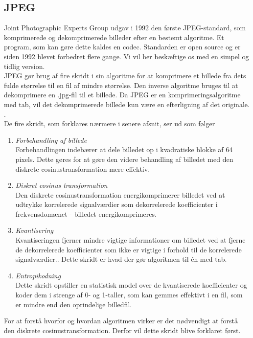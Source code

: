 \subsection{JPEG}
Joint Photographic Experts Group udgav i 1992 den første JPEG-standard, som komprimerede og dekomprimerede billeder efter en bestemt algoritme. Et program, som kan gøre dette kaldes en codec. Standarden er open source og er siden 1992 blevet forbedret flere gange. Vi vil her beskæftige os med en simpel og tidlig version.\\
JPEG gør brug af fire skridt i sin algoritme for at komprimere et billede fra dets fulde størrelse til en fil af mindre størrelse. Den inverse algoritme bruges til at dekomprimere en .jpg-fil til et billede. Da JPEG er en komprimeringsalgoritme med tab, vil det dekomprimerede billede kun være en efterligning af det originale. \citep{whydomath_basic}.\\
De fire skridt, som forklares nærmere i senere afsnit, ser ud som følger
\begin{enumerate}
	\item{\textit{Forbehandling af billede}\\
	Forbehandlingen indebærer at dele billedet op i kvadratiske blokke af 64 pixels. Dette gøres for at gøre den videre behandling af billedet med den diskrete cosinustransformation mere effektiv.}
	\item{\textit{Diskret cosinus transformation}\\
	Den diskrete cosinustransformation energikomprimerer billedet ved at udtrykke korrelerede signalværdier som dekorrelerede koefficienter i frekvensdomænet - billedet energikomprimeres.}
	\item{\textit{Kvantisering}\\
	Kvantiseringen fjerner mindre vigtige informationer om billedet ved at fjerne de dekorrelerede koefficienter som ikke er vigtige i forhold til de korrelerede signalværdier.. Dette skridt er hvad der gør algoritmen til én med tab.}
	\item{\textit{Entropikodning}\\
	Dette skridt opstiller en statistisk model over de kvantiserede koefficienter og koder dem i strenge af 0- og 1-taller, som kan gemmes effektivt i en fil, som er mindre end den oprindelige billedfil.}
\end{enumerate}

For at forstå hvorfor og hvordan algoritmen virker er det nødvendigt at forstå den diskrete cosinustransformation. Derfor vil dette skridt blive forklaret først.

